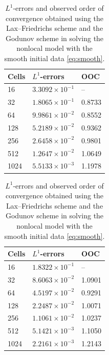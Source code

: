 \begin{table}[H]
    \centering
    \begin{minipage}{0.45\textwidth}
        \centering
        \begin{tabular}{ |p{1.5cm}||p{2.2cm}| |p{1.5cm}| }
            \hline
            \textbf{Cells } & $L^{1}$-\textbf{errors}  & \textbf{OOC} \\
            \hline
            16              & $3.3092 \times 10^{-1}$  & --           \\
            32              & $1.8065 \times 10^{-1} $ & 0.8733       \\
            64              & $9.9861 \times 10^{-2} $ & 0.8552       \\
            128             & $5.2189 \times 10^{-2}$  & 0.9362       \\
            256             & $2.6458 \times 10^{-2}$  & 0.9801       \\
            512             & $1.2647 \times 10^{-2}$  & 1.0649       \\
            1024            & $ 5.5133 \times 10^{-3}$ & 1.1978       \\
            \hline
        \end{tabular}
        \caption*{(a) Lax--Friedrichs scheme}
    \end{minipage}
    \hfill
    \begin{minipage}{0.5\textwidth}
        \centering
        \begin{tabular}{ |p{1.5cm}||p{2.2cm}| |p{1.5cm}| }
            \hline
            \textbf{Cells } & $L^{1}$-\textbf{errors} & \textbf{OOC} \\
            \hline
            16              & $1.8322 \times 10^{-1}$ & --           \\
            32              & $8.6063 \times 10^{-2}$ & 1.0901       \\
            64              & $4.5197 \times 10^{-2}$ & 0.9291       \\
            128             & $2.2487 \times 10^{-2}$ & 1.0071       \\
            256             & $1.1061 \times 10^{-2}$ & 1.0237       \\
            512             & $5.1421 \times 10^{-3}$ & 1.1050       \\
            1024            & $2.2161 \times 10^{-3}$ & 1.2143       \\
            \hline
        \end{tabular}
        \caption*{(b) Godunov scheme}
    \end{minipage}

    \caption{$L^{1}$-errors and observed order of convergence obtained using the Lax--Friedrichs scheme and the Godunov scheme in solving the nonlocal model with the smooth initial data \eqref{eq:smooth}.}
    \label{tab:table_6}
\end{table}

